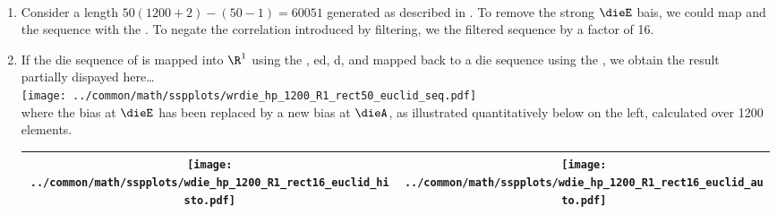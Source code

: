 \begin{example}
\label{ex:wdie_hp}
\mbox{}\\
\begin{enumerate}
  \item \label{item:wdie_hp_seq}
        Consider a length $50(1200+2)-(50-1)=60051$   generated as 
        described in .
        To remove the strong $\dieE$ bais, we could map and  the sequence with the 
         .
        To negate the correlation introduced by filtering, 
        we  the filtered sequence by a factor of 16.

  \item \label{item:wdie_hp_R1_rect16_euclid}
        If the die sequence of  is mapped into $\R^1$ using the
         , ed,
        d, and mapped back to a die sequence using the ,
        we obtain the result partially dispayed here\ldots
          \\\texttt{[image: ../common/math/sspplots/wrdie\_hp\_1200\_R1\_rect50\_euclid\_seq.pdf]}\\
        where the bias at $\dieE$ has been replaced by a new bias at $\dieA$, 
        as illustrated quantitatively below on the left, 
        calculated over 1200 elements. 
          \\\begin{tabular}{|>{\scs}c|>{\scs}c|}
               \hline
               \texttt{[image: ../common/math/sspplots/wdie\_hp\_1200\_R1\_rect16\_euclid\_histo.pdf]}
              &\texttt{[image: ../common/math/sspplots/wdie\_hp\_1200\_R1\_rect16\_euclid\_auto.pdf]}
             \\\hline
          \end{tabular}


\end{enumerate}
\end{example}
